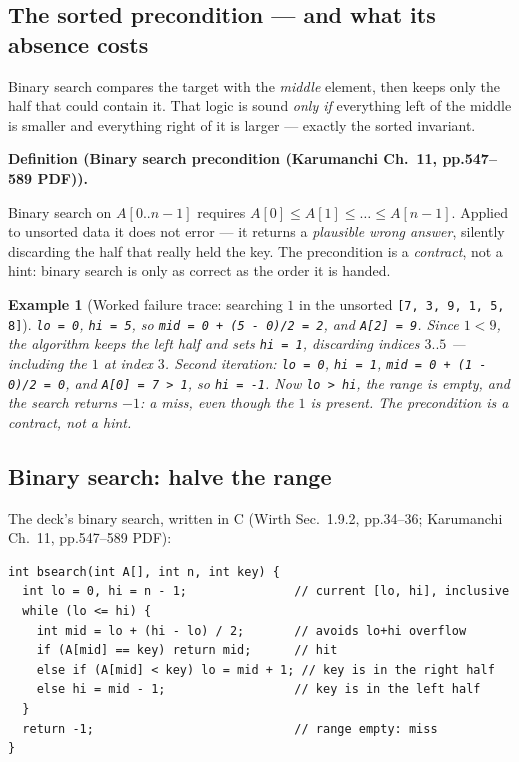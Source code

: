 \documentclass[11pt]{article}
\newtheorem{example}{Example}[section]
\newenvironment{definitionbox}[1]{%
  \par\noindent\textbf{Definition (#1).}\ \itshape
}{\par\vspace{0.3em}}
\begin{document}
\subsection{The sorted precondition --- and what its absence costs}

Binary search compares the target with the \emph{middle} element, then keeps only the half that could contain it. That logic is sound \emph{only if} everything left of the middle is smaller and everything right of it is larger --- exactly the sorted invariant.

\begin{definitionbox}{Binary search precondition (Karumanchi Ch.~11, pp.547--589 PDF)}
Binary search on $A[0..n-1]$ requires $A[0] \le A[1] \le \dots \le A[n-1]$. Applied to unsorted data it does not error --- it returns a \emph{plausible wrong answer}, silently discarding the half that really held the key. The precondition is a \emph{contract}, not a hint: binary search is only as correct as the order it is handed. \cite{Karumanchi2017_data_structures_algorithms_made_easy}
\end{definitionbox}

\begin{example}[Worked failure trace: searching $1$ in the unsorted \texttt{[7, 3, 9, 1, 5, 8]}]
\texttt{lo = 0}, \texttt{hi = 5}, so \texttt{mid = 0 + (5 - 0)/2 = 2}, and \texttt{A[2] = 9}. Since $1 < 9$, the algorithm keeps the left half and sets \texttt{hi = 1}, discarding indices $3..5$ --- \emph{including the $1$ at index $3$}. Second iteration: \texttt{lo = 0}, \texttt{hi = 1}, \texttt{mid = 0 + (1 - 0)/2 = 0}, and \texttt{A[0] = 7 > 1}, so \texttt{hi = -1}. Now \texttt{lo > hi}, the range is empty, and the search returns $-1$: a miss, even though the $1$ is present. The precondition is a contract, not a hint.
\end{example}

\subsection{Binary search: halve the range}

The deck's binary search, written in C (Wirth Sec.~1.9.2, pp.34--36; Karumanchi Ch.~11, pp.547--589 PDF):

{\footnotesize
\begin{verbatim}
int bsearch(int A[], int n, int key) {
  int lo = 0, hi = n - 1;               // current [lo, hi], inclusive
  while (lo <= hi) {
    int mid = lo + (hi - lo) / 2;       // avoids lo+hi overflow
    if (A[mid] == key) return mid;      // hit
    else if (A[mid] < key) lo = mid + 1; // key is in the right half
    else hi = mid - 1;                  // key is in the left half
  }
  return -1;                            // range empty: miss
}
\end{verbatim}
}
\end{document}
